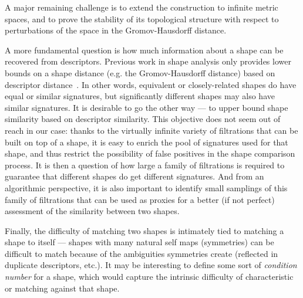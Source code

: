 A major remaining challenge is to extend the
construction to infinite metric spaces, and to prove the stability of
its topological structure with respect to perturbations of the space
in the Gromov-Hausdorff distance.

A more fundamental question is how much information about a shape can
be recovered from descriptors. Previous work in shape analysis only
provides lower bounds on a shape distance (e.g. the Gromov-Hausdorff
distance) based on descriptor distance~\cite{survey-on-signatures}. In
other words, equivalent or closely-related shapes do have equal or
similar signatures, but significantly different shapes may also have
similar signatures. It is desirable to go the other way --- to upper
bound shape similarity based on descriptor similarity. This objective
does not seem out of reach in our case: thanks to the virtually
infinite variety of filtrations that can be built on top of a shape,
it is easy to enrich the pool of signatures used for that shape, and
thus restrict the possibility of false positives in the shape
comparison process. It is then a question of how large a family of
filtrations is required to guarantee that different shapes do get
different signatures. And from an algorithmic perspective, it is also
important to identify small samplings of this family of filtrations
that can be used as proxies for a better (if not perfect) assessment
of the similarity between two shapes.

Finally, the difficulty of matching two shapes is
intimately tied to matching a shape to itself --- shapes with many
natural self maps (symmetries) can be difficult to match because of
the ambiguities symmetries create (reflected in duplicate descriptors,
etc.). It may be interesting to define some sort of {\em condition
  number} for a shape, which would capture the intrinsic difficulty of
characteristic or matching against that shape.



